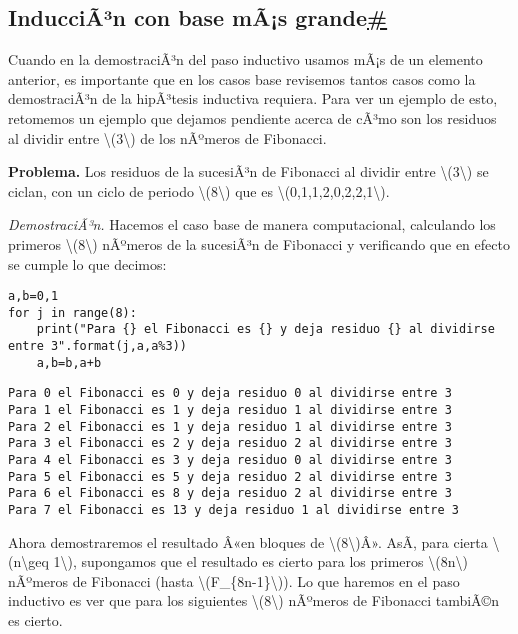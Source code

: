 \label{induccion-con-base-mas-grande}
\subsection{\texorpdfstring{InducciÃ³n con base mÃ¡s
grande\hyperref[induccion-con-base-mas-grande]{\#}}{InducciÃ³n con base mÃ¡s grande\#}}\label{inducciuxe3uxb3n-con-base-muxe3s-grande}

Cuando en la demostraciÃ³n del paso inductivo usamos mÃ¡s de un elemento
anterior, es importante que en los casos base revisemos tantos casos
como la demostraciÃ³n de la hipÃ³tesis inductiva requiera. Para ver un
ejemplo de esto, retomemos un ejemplo que dejamos pendiente acerca de
cÃ³mo son los residuos al dividir entre
{\textbackslash(3\textbackslash)} de los nÃºmeros de Fibonacci.

\textbf{Problema.} Los residuos de la sucesiÃ³n de Fibonacci al dividir
entre {\textbackslash(3\textbackslash)} se ciclan, con un ciclo de
periodo {\textbackslash(8\textbackslash)} que es
{\textbackslash(0,1,1,2,0,2,2,1\textbackslash)}.

\emph{DemostraciÃ³n.} Hacemos el caso base de manera computacional,
calculando los primeros {\textbackslash(8\textbackslash)} nÃºmeros de la
sucesiÃ³n de Fibonacci y verificando que en efecto se cumple lo que
decimos:

\begin{verbatim}
a,b=0,1
for j in range(8):
    print("Para {} el Fibonacci es {} y deja residuo {} al dividirse entre 3".format(j,a,a%3))
    a,b=b,a+b
\end{verbatim}

\begin{verbatim}
Para 0 el Fibonacci es 0 y deja residuo 0 al dividirse entre 3
Para 1 el Fibonacci es 1 y deja residuo 1 al dividirse entre 3
Para 2 el Fibonacci es 1 y deja residuo 1 al dividirse entre 3
Para 3 el Fibonacci es 2 y deja residuo 2 al dividirse entre 3
Para 4 el Fibonacci es 3 y deja residuo 0 al dividirse entre 3
Para 5 el Fibonacci es 5 y deja residuo 2 al dividirse entre 3
Para 6 el Fibonacci es 8 y deja residuo 2 al dividirse entre 3
Para 7 el Fibonacci es 13 y deja residuo 1 al dividirse entre 3
\end{verbatim}

Ahora demostraremos el resultado Â«en bloques de
{\textbackslash(8\textbackslash)}Â». AsÃ­, para cierta
{\textbackslash(n\textbackslash geq 1\textbackslash)}, supongamos que el
resultado es cierto para los primeros {\textbackslash(8n\textbackslash)}
nÃºmeros de Fibonacci (hasta
{\textbackslash(F\_\{8n-1\}\textbackslash)}). Lo que haremos en el paso
inductivo es ver que para los siguientes
{\textbackslash(8\textbackslash)} nÃºmeros de Fibonacci tambiÃ©n es
cierto.

